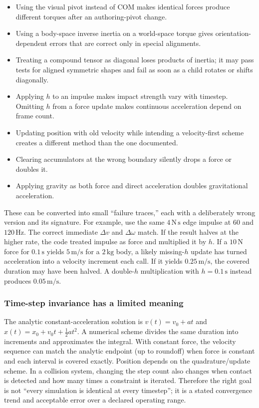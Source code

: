 \begin{itemize}
\tightlist
\item
  Using the visual pivot instead of COM makes identical forces produce different torques after an authoring-pivot change.
\item
  Using a body-space inverse inertia on a world-space torque gives orientation-dependent errors that are correct only in special alignments.
\item
  Treating a compound tensor as diagonal loses products of inertia; it may pass tests for aligned symmetric shapes and fail as soon as a child rotates or shifts diagonally.
\item
  Applying \(h\) to an impulse makes impact strength vary with timestep. Omitting \(h\) from a force update makes continuous acceleration depend on frame count.
\item
  Updating position with old velocity while intending a velocity-first scheme creates a different method than the one documented.
\item
  Clearing accumulators at the wrong boundary silently drops a force or doubles it.
\item
  Applying gravity as both force and direct acceleration doubles gravitational acceleration.
\end{itemize}

These can be converted into small ``failure traces,'' each with a deliberately wrong version and its signature. For example, use the same \(4\,\mathrm{N\,s}\) edge impulse at \(60\) and \(120\,\mathrm{Hz}\). The correct immediate \(\Delta v\) and \(\Delta\omega\) match. If the result halves at the higher rate, the code treated impulse as force and multiplied it by \(h\). If a \(10\,\mathrm N\) force for \(0.1\,\mathrm s\) yields \(5\,\mathrm{m/s}\) for a \(2\,\mathrm{kg}\) body, a likely missing-\(h\) update has turned acceleration into a velocity increment each call. If it yields \(0.25\,\mathrm{m/s}\), the covered duration may have been halved. A double-\(h\) multiplication with \(h=0.1\,\mathrm s\) instead produces \(0.05\,\mathrm{m/s}\).

\subsubsection{Time-step invariance has a limited meaning}\label{06-engine-ii-ch034-time-step-invariance-has-a-limited-meaning}

The analytic constant-acceleration solution is \(v(t)=v_0+at\) and \(x(t)=x_0+v_0t+\tfrac12at^2\). A numerical scheme divides the same duration into increments and approximates the integral. With constant force, the velocity sequence can match the analytic endpoint (up to roundoff) when force is constant and each interval is covered exactly. Position depends on the quadrature/update scheme. In a collision system, changing the step count also changes when contact is detected and how many times a constraint is iterated. Therefore the right goal is not ``every simulation is identical at every timestep''; it is a stated convergence trend and acceptable error over a declared operating range.

